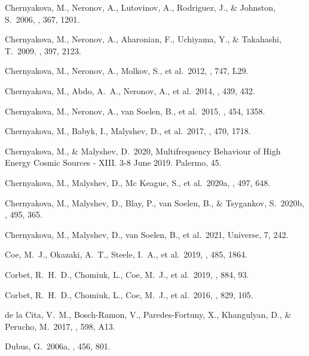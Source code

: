 \documentclass{aa}
\begin{document}
\begin{thebibliography}{}
 Chernyakova, M., Neronov, A., Lutovinov, A., Rodriguez, J., \& Johnston, S.\ 2006, \mnras, 367, 1201.

 Chernyakova, M., Neronov, A., Aharonian, F., Uchiyama, Y., \& Takahashi, T.\ 2009, \mnras, 397, 2123.

 Chernyakova, M., Neronov, A., Molkov, S., et al.\ 2012, \apjl, 747, L29.

 Chernyakova, M., Abdo, A.~A., Neronov, A., et al.\ 2014, \mnras, 439, 432.

 Chernyakova, M., Neronov, A., van Soelen, B., et al.\ 2015, \mnras, 454, 1358.

 Chernyakova, M., Babyk, I., Malyshev, D., et al.\ 2017, \mnras, 470, 1718.

 Chernyakova, M., \& Malyshev, D.\ 2020, Multifrequency Behaviour of High Energy Cosmic Sources - XIII. 3-8 June 2019. Palermo, 45.

 Chernyakova, M., Malyshev, D., Mc Keague, S., et al.\ 2020a, \mnras, 497, 648.

 Chernyakova, M., Malyshev, D., Blay, P., van Soelen, B., \& Tsygankov, S.\ 2020b, \mnras, 495, 365.

 Chernyakova, M., Malyshev, D., van Soelen, B., et al.\ 2021, Universe, 7, 242.

 Coe, M.~J., Okazaki, A.~T., Steele, I.~A., et al.\ 2019, \mnras, 485, 1864.

 Corbet, R.~H.~D., Chomiuk, L., Coe, M.~J., et al.\ 2019, \apj, 884, 93.

 Corbet, R.~H.~D., Chomiuk, L., Coe, M.~J., et al.\ 2016, \apj, 829, 105.

 de la Cita, V.~M., Bosch-Ramon, V., Paredes-Fortuny, X., Khangulyan, D., \& Perucho, M.\ 2017, \aap, 598, A13.

 Dubus, G.\ 2006a, \aap, 456, 801.


\end{thebibliography}
\end{document}
